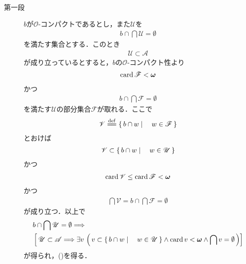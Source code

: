 	\begin{sketch}\mbox{}
		\begin{description}
			\item[第一段]
				$b$が$\mathscr{O}$-コンパクトであるとし，また$\mathscr{U}$を
				\begin{align}
					b \cap \bigcap \mathscr{U} = \emptyset
				\end{align}
				を満たす集合とする．このとき
				\begin{align}
					\mathscr{U} \subset \mathscr{A}
				\end{align}
				が成り立っているとすると，$b$の$\mathscr{O}$-コンパクト性より
				\begin{align}
					\operatorname{card} \mathscr{F} < {\boldsymbol \omega}
				\end{align}
				かつ
				\begin{align}
					b \cap \bigcap \mathscr{F} = \emptyset
				\end{align}
				を満たす$\mathscr{U}$の部分集合$\mathscr{F}$が取れる．ここで
				\begin{align}
					\mathscr{V} \defeq \Set{b \cap w}{w \in \mathscr{F}}
				\end{align}
				とおけば
				\begin{align}
					\mathscr{V} \subset \left\{\, b \cap w \mid \quad w \in \mathscr{U}\, \right\}
				\end{align}
				かつ
				\begin{align}
					\operatorname{card} \mathscr{V} \leq \operatorname{card} \mathscr{F} < {\boldsymbol \omega}
				\end{align}
				かつ
				\begin{align}
					\bigcap \mathscr{V} = b \cap \bigcap \mathscr{F} = \emptyset
				\end{align}
				が成り立つ．以上で
				\begin{align}
					&b \cap \bigcap \mathscr{U} = \emptyset \Longrightarrow \\
					&\left[\, \mathscr{U} \subset \mathscr{A} \Longrightarrow
						\exists v\, \left(\, v \subset \left\{\, b \cap w \mid \quad w \in \mathscr{U}\, \right\}
						\wedge \operatorname{card} v < {\boldsymbol \omega} 
						\wedge \bigcap v = \emptyset\, \right)
					\right]
				\end{align}
				が得られ，()を得る．
				

\end{description}
\end{sketch}
